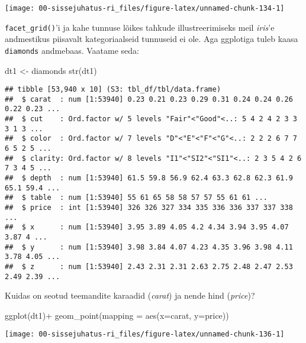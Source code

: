 \documentclass[
]{book}
\newenvironment{Shaded}{\begin{snugshade}}{\end{snugshade}}
\newcommand{\AttributeTok}[1]{\textcolor[rgb]{0.77,0.63,0.00}{#1}}
\newcommand{\FunctionTok}[1]{\textcolor[rgb]{0.00,0.00,0.00}{#1}}
\newcommand{\NormalTok}[1]{#1}
\newcommand{\OtherTok}[1]{\textcolor[rgb]{0.56,0.35,0.01}{#1}}
\newcommand{\SpecialCharTok}[1]{\textcolor[rgb]{0.00,0.00,0.00}{#1}}
\begin{document}
\begin{center}\texttt{[image: 00-sissejuhatus-ri\_files/figure-latex/unnamed-chunk-134-1]} \end{center}

\texttt{facet\_grid()}'i ja kahe tunnuse lõikes tahkude illustreerimiseks meil \emph{iris}'e andmestikus piisavalt kategoriaalseid tunnuseid ei ole. Aga ggplotiga tuleb kaasa \texttt{diamonds} andmebaas. Vaatame seda:

\begin{Shaded}
\begin{Highlighting}[]
\NormalTok{dt1 }\OtherTok{\textless{}{-}}\NormalTok{ diamonds}
\FunctionTok{str}\NormalTok{(dt1)}
\end{Highlighting}
\end{Shaded}

\begin{verbatim}
## tibble [53,940 x 10] (S3: tbl_df/tbl/data.frame)
##  $ carat  : num [1:53940] 0.23 0.21 0.23 0.29 0.31 0.24 0.24 0.26 0.22 0.23 ...
##  $ cut    : Ord.factor w/ 5 levels "Fair"<"Good"<..: 5 4 2 4 2 3 3 3 1 3 ...
##  $ color  : Ord.factor w/ 7 levels "D"<"E"<"F"<"G"<..: 2 2 2 6 7 7 6 5 2 5 ...
##  $ clarity: Ord.factor w/ 8 levels "I1"<"SI2"<"SI1"<..: 2 3 5 4 2 6 7 3 4 5 ...
##  $ depth  : num [1:53940] 61.5 59.8 56.9 62.4 63.3 62.8 62.3 61.9 65.1 59.4 ...
##  $ table  : num [1:53940] 55 61 65 58 58 57 57 55 61 61 ...
##  $ price  : int [1:53940] 326 326 327 334 335 336 336 337 337 338 ...
##  $ x      : num [1:53940] 3.95 3.89 4.05 4.2 4.34 3.94 3.95 4.07 3.87 4 ...
##  $ y      : num [1:53940] 3.98 3.84 4.07 4.23 4.35 3.96 3.98 4.11 3.78 4.05 ...
##  $ z      : num [1:53940] 2.43 2.31 2.31 2.63 2.75 2.48 2.47 2.53 2.49 2.39 ...
\end{verbatim}

Kuidas on seotud teemandite karaadid (\emph{carat}) ja nende hind (\emph{price})?

\begin{Shaded}
\begin{Highlighting}[]
\FunctionTok{ggplot}\NormalTok{(dt1)}\SpecialCharTok{+}
  \FunctionTok{geom\_point}\NormalTok{(}\AttributeTok{mapping =} \FunctionTok{aes}\NormalTok{(}\AttributeTok{x=}\NormalTok{carat, }\AttributeTok{y=}\NormalTok{price))}
\end{Highlighting}
\end{Shaded}

\begin{center}\texttt{[image: 00-sissejuhatus-ri\_files/figure-latex/unnamed-chunk-136-1]} \end{center}
\end{document}
